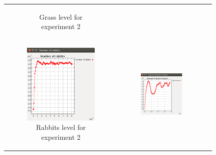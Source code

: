 \documentclass[11pt]{article}
\begin{document}
\begin{figure}
\begin{tabular}{c c c}
\begin{subfigure}[b]{0.3\textwidth}
        \caption{\label{img:grass2} Grass level for experiment 2}
    \end{subfigure}\\
    \begin{subfigure}[b]{0.3\textwidth}
        \includegraphics[width=\textwidth]{experiment/3/Rabbits.png}
        \caption{\label{img:rabbits2} Rabbits level for experiment 2}
    \end{subfigure} & 
    \begin{subfigure}[b]{0.3\textwidth}
        \includegraphics[width=\textwidth]{experiment/4/Grass.png}

\end{subfigure}
\end{tabular}
\end{figure}
\end{document}

